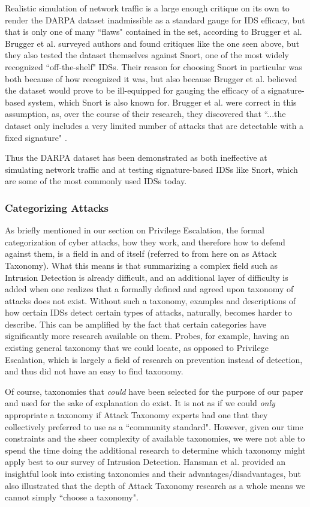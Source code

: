 \documentclass{acm_proc_article-sp}
\begin{document}
    	Realistic simulation of network traffic is a large enough critique on its own to render the DARPA dataset inadmissible as a standard gauge for IDS efficacy, but that is only one of many ``flaws" contained in the set, according to Brugger et al. Brugger et al. surveyed authors and found critiques like the one seen above, but they also tested the dataset themselves against Snort, one of the most widely recognized ``off-the-shelf" IDSs. Their reason for choosing Snort in particular was both because of how recognized it was, but also because Brugger et al. believed the dataset would prove to be ill-equipped for gauging the efficacy of a signature-based system, which Snort is also known for. Brugger et al. were correct in this assumption, as, over the course of their research, they discovered that ``...the dataset only includes a very limited number of attacks that are detectable with a fixed signature" \cite{Brugger2007}. 
    	
    	Thus the DARPA dataset has been demonstrated as both ineffective at simulating network traffic and at testing signature-based IDSs like Snort, which are some of the most commonly used IDSs today. 
    	\subsubsection{Categorizing Attacks} 
    	As briefly mentioned in our section on Privilege Escalation, the formal categorization of cyber attacks, how they work, and therefore how to defend against them, is a field in and of itself (referred to from here on as Attack Taxonomy). What this means is that summarizing a complex field such as Intrusion Detection is already difficult, and an additional layer of difficulty is added when one realizes that a formally defined and agreed upon taxonomy of attacks does not exist. Without such a taxonomy, examples and descriptions of how certain IDSs detect certain types of attacks, naturally, becomes harder to describe. This can be amplified by the fact that certain categories have significantly more research available on them. Probes, for example, having an existing general taxonomy that we could locate, as opposed to Privilege Escalation, which is largely a field of research on prevention instead of detection, and thus did not have an easy to find taxonomy. 
    	
    	Of course, taxonomies that \emph{could} have been selected for the purpose of our paper and used for the sake of explanation do exist. It is not as if we could \emph{only} appropriate a taxonomy if Attack Taxonomy experts had one that they collectively preferred to use as a ``community standard". However, given our time constraints and the sheer complexity of available taxonomies, we were not able to spend the time doing the additional research to determine which taxonomy might apply best to our survey of Intrusion Detection. Hansman et al. \cite{Hansman2005} provided an insightful look into existing taxonomies and their advantages/disadvantages, but also illustrated that the depth of Attack Taxonomy research as a whole means we cannot simply ``choose a taxonomy". 
    	
\end{document}
